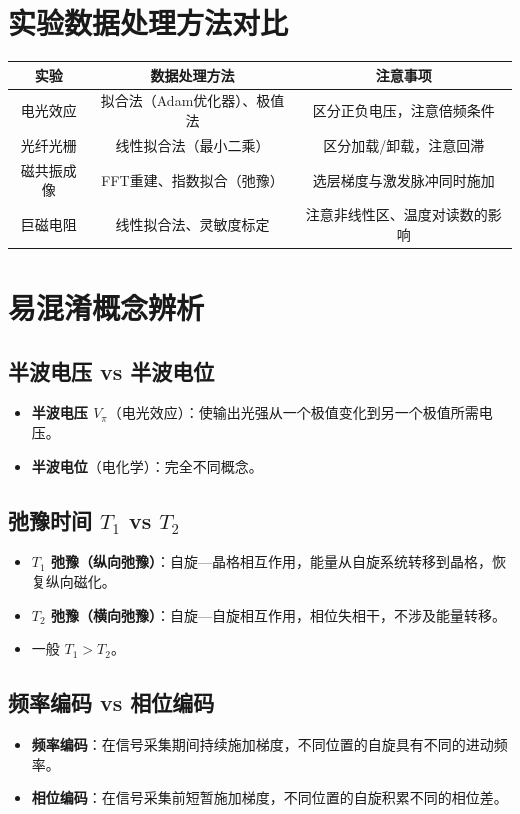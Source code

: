 \documentclass[12pt,a4paper]{article}
\newcommand{\hl}[1]{\textbf{\color{red}#1}}
\begin{document}
\section{实验数据处理方法对比}

\begin{tabular}{|c|c|c|}
    \hline
    \textbf{实验} & \textbf{数据处理方法} & \textbf{注意事项} \\
    \hline
    电光效应 & 拟合法（Adam优化器）、极值法 & 区分正负电压，注意倍频条件 \\
    \hline
    光纤光栅 & 线性拟合法（最小二乘） & 区分加载/卸载，注意回滞 \\
    \hline
    磁共振成像 & FFT重建、指数拟合（弛豫） & 选层梯度与激发脉冲同时施加 \\
    \hline
    巨磁电阻 & 线性拟合法、灵敏度标定 & 注意非线性区、温度对读数的影响 \\
    \hline
\end{tabular}

\section{易混淆概念辨析}

\subsection{半波电压 vs 半波电位}
\begin{itemize}
    \item \textbf{半波电压 \(V_\pi\)}（电光效应）：使输出光强从一个极值变化到另一个极值所需电压。
    \item \textbf{半波电位}（电化学）：完全不同概念。
\end{itemize}

\subsection{弛豫时间 \(T_1\) vs \(T_2\)}
\begin{itemize}
    \item \hl{\(T_1\) 弛豫（纵向弛豫）}：自旋—晶格相互作用，能量从自旋系统转移到晶格，恢复纵向磁化。
    \item \hl{\(T_2\) 弛豫（横向弛豫）}：自旋—自旋相互作用，相位失相干，不涉及能量转移。
    \item 一般 \(T_1 > T_2\)。
\end{itemize}

\subsection{频率编码 vs 相位编码}
\begin{itemize}
    \item \textbf{频率编码}：在信号采集期间持续施加梯度，不同位置的自旋具有不同的进动频率。
    \item \textbf{相位编码}：在信号采集前短暂施加梯度，不同位置的自旋积累不同的相位差。
\end{itemize}
\end{document}
